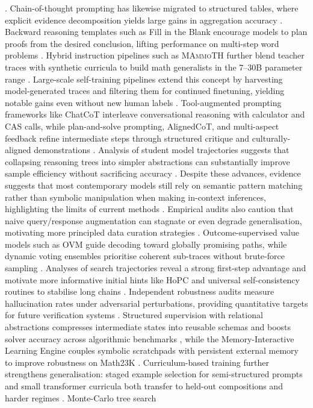 \documentclass[acmsmall,anonymous]{acmart}
\begin{document}
\cite{azerbayev-2024-llemma}.  Chain-of-thought prompting has likewise migrated to structured tables, where explicit evidence decomposition yields large gains in aggregation accuracy \cite{zheng-2023-tabular-cot}.  Backward reasoning templates such as Fill in the Blank encourage models to plan proofs from the desired conclusion, lifting performance on multi-step word problems \cite{deb-2024-backward-reasoning}.  Hybrid instruction pipelines such as \textsc{MAmmoTH} further blend teacher traces with synthetic curricula to build math generalists in the 7--30B parameter range \cite{yue-2023-mammoth}.  Large-scale self-training pipelines extend this concept by harvesting model-generated traces and filtering them for continued finetuning, yielding notable gains even without new human labels \cite{singh-2024-beyond-human-data}.  Tool-augmented prompting frameworks like ChatCoT interleave conversational reasoning with calculator and CAS calls, while plan-and-solve prompting, AlignedCoT, and multi-aspect feedback refine intermediate steps through structured critique and culturally-aligned demonstrations \cite{chen-2023-chatcot,wang-2023-plan-and-solve,yang-2024-alignedcot,nathani-2023-maf}.  Analysis of student model trajectories suggests that collapsing reasoning trees into simpler abstractions can substantially improve sample efficiency without sacrificing accuracy \cite{yan2023complexsimpleunravelingcognitive}.  Despite these advances, evidence suggests that most contemporary models still rely on semantic pattern matching rather than symbolic manipulation when making in-context inferences, highlighting the limits of current methods \cite{tang2023largelanguagemodelsincontext}.  Empirical audits also caution that naive query/response augmentation can stagnate or even degrade generalisation, motivating more principled data curation strategies \cite{zhang-2024-query-augmentation,li-2024-mugglemath}.  Outcome-supervised value models such as OVM guide decoding toward globally promising paths, while dynamic voting ensembles prioritise coherent sub-traces without brute-force sampling \cite{yu2024ovmoutcomesupervisedvaluemodels,xue-2023-dynamic-voting}.  Analyses of search trajectories reveal a strong first-step advantage and motivate more informative initial hints like HoPC and universal self-consistency routines to stabilise long chains \cite{jain2024firststepadvantageimportancestarting,lei2025hintpseudocodehopc,chen2023universalselfconsistencylargelanguage}.  Independent robustness audits measure hallucination rates under adversarial perturbations, providing quantitative targets for future verification systems \cite{qian-2024-hallucination-eval}.  Structured supervision with relational abstractions compresses intermediate states into reusable schemas and boosts solver accuracy across algorithmic benchmarks \cite{nam-2022-relational-abstractions}, while the Memory-Interactive Learning Engine couples symbolic scratchpads with persistent external memory to improve robustness on Math23K \cite{wu-2022-mile}.  Curriculum-based training further strengthens generalisation: staged example selection for semi-structured prompts and small transformer curricula both transfer to held-out compositions and harder regimes \cite{nam-2022-ood-curriculum,nam-2022-ood-transformers}. Monte-Carlo tree search 
\end{document}

